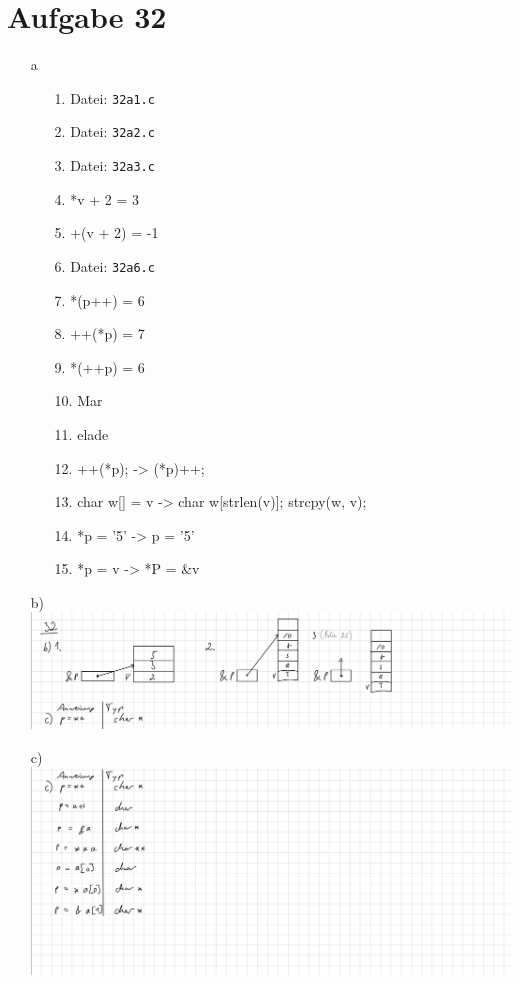 \documentclass[paper=a4, %
         fontsize=10pt,  %
         oneside,        %
         headsepline,    %
         notitlepage     %
]{scrartcl}              %
\newcommand{\includecode}[1]{}
\newcommand{\includecodewithfilename}[1]{Datei: \texttt{#1}\vspace*{-1.5mm}\includecode{#1}}
\newcommand{\aufgabe}[1]{\section*{Aufgabe #1}}
\begin{document}
\aufgabe{32}
\begin{enumerate}
    \item[a]
    \begin{enumerate}
        \item[1.] \includecodewithfilename{32a1.c}
        \item[2.] \includecodewithfilename{32a2.c}
        \item[3.] \includecodewithfilename{32a3.c}
        \item[4.] *v + 2 = 3
        \item[5.] +(v + 2) = -1   
        \item[6.] \includecodewithfilename{32a6.c}
        \item[7.] *(p++) = 6
        \item[8.] ++(*p) = 7
        \item[9.] *(++p) = 6
        \item[10.] Mar
        \item[11.] elade
        \item[12.] ++(*p); -> (*p)++; 
        \item[13.] char w[] = v -> char w[strlen(v)]; strcpy(w, v);
        \item[14.] *p = '5' -> p = '5'
        \item[15.] *p = v -> *P = \&v             
    \end{enumerate}
    \item[b)] \includegraphics{32b.png}
    \item[c)] \includegraphics{32c.png} 
\end{enumerate}




\end{document}

